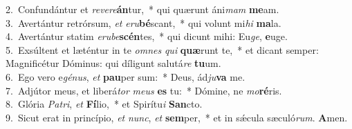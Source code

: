 {2.~}Confundántur et \textit{re}\textit{ve}\textit{re}\textbf{án}tur,~* qui quærunt áni\textit{mam} \textbf{me}am.\\
{3.~}Avertántur retrórsum, \textit{et} \textit{e}\textit{ru}\textbf{bé}scant,~* qui volunt mi\textit{hi} \textbf{ma}la.\\
{4.~}Avertántur statim \textit{e}\textit{ru}\textit{be}\textbf{scén}tes,~* qui dicunt mihi: Eu\textit{ge}, \textbf{e}uge.\\
{5.~}Exsúltent et læténtur in te \textit{om}\textit{nes} \textit{qui} \textbf{quæ}runt te,~* et dicant semper: Magnificétur Dóminus: qui díligunt salutá\textit{re} \textbf{tu}um.\\
{6.~}Ego vero e\textit{gé}\textit{nus}, \textit{et} \textbf{pau}per sum:~* Deus, ád\textit{ju}\textbf{va} me.\\
{7.~}Adjútor meus, et liberá\textit{tor} \textit{me}\textit{us} \textbf{es} tu:~* Dómine, ne \textit{mo}\textbf{ré}ris.\\
{8.~}Glória \textit{Pa}\textit{tri}, \textit{et} \textbf{Fí}lio,~* et Spirítu\textit{i} \textbf{San}cto.\\
{9.~}Sicut erat in princípio, \textit{et} \textit{nunc}, \textit{et} \textbf{sem}per,~* et in sǽcula sæculó\textit{rum}. \textbf{A}men.\\
